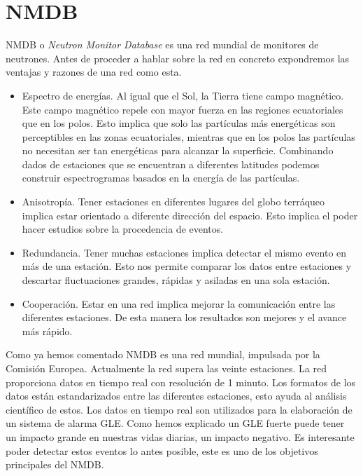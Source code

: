 \section{NMDB}
	NMDB\cite{NMDB2011}  o \emph{Neutron Monitor Database} es una red mundial de monitores de neutrones. Antes de proceder a hablar sobre la red
	en concreto expondremos las ventajas y razones de una red como esta.
	\begin{itemize}
		\item 	Espectro de energías. Al igual que el Sol, la Tierra tiene campo magnético. Este campo magnético repele con mayor fuerza en
		  	las regiones ecuatoriales que en los polos. Esto implica que solo las partículas más energéticas son perceptibles en las
			zonas ecuatoriales, mientras que en los polos las partículas no necesitan ser tan energéticas para alcanzar la superficie.
			Combinando dados de estaciones que se encuentran a diferentes latitudes podemos construir espectrogramas basados en la energía
			de las partículas.
		\item 	Anisotropía. Tener estaciones en diferentes lugares del globo terráqueo implica estar orientado a diferente dirección del
		  	espacio. Esto implica el poder hacer estudios sobre la procedencia de eventos.
		\item 	Redundancia. Tener muchas estaciones implica detectar el mismo evento en más de una estación. Esto nos permite comparar
		  	los datos entre estaciones y descartar fluctuaciones grandes, rápidas y asiladas en una sola estación.
		\item 	Cooperación. Estar en una red implica mejorar la comunicación entre las diferentes estaciones. De esta manera los resultados
		  	son mejores y el avance más rápido. 
	\end{itemize}
	\par
	Como ya hemos comentado NMDB es una red mundial, impulsada por la Comisión Europea. Actualmente la red supera las veinte estaciones. La red
	proporciona datos en tiempo real con resolución de 1 minuto. Los formatos de los datos están estandarizados entre las diferentes estaciones,
	esto ayuda al análisis científico de estos. Los datos en tiempo real son utilizados para la elaboración de un sistema de alarma
	GLE\cite{GleAlarm}. Como hemos explicado un GLE fuerte puede tener un impacto grande en nuestras vidas diarias, un impacto negativo. Es
	interesante poder detectar estos eventos lo antes posible, este es uno de los objetivos principales del NMDB. 

